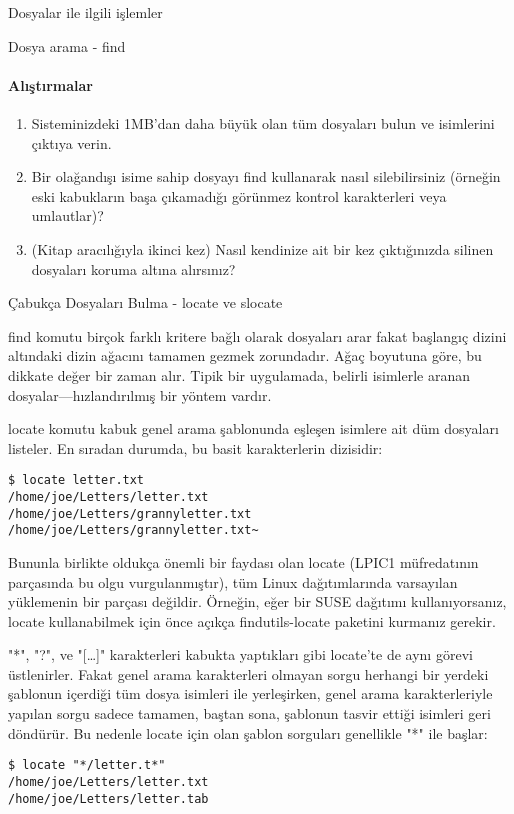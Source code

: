 \begin{section}{Dosyalar ile ilgili işlemler}
\begin{subsection}{Dosya arama - find}
\paragraph{{\Huge{\PencilLeftDown}}Alıştırmalar}{
\begin{enumerate}
 \item Sisteminizdeki 1MB'dan daha büyük olan tüm dosyaları bulun ve isimlerini çıktıya verin.
 \item Bir olağandışı isime sahip dosyayı find kullanarak nasıl silebilirsiniz (örneğin eski kabukların başa çıkamadığı görünmez kontrol karakterleri veya umlautlar)?
 \item (Kitap aracılığıyla ikinci kez) Nasıl kendinize ait bir kez çıktığınızda silinen dosyaları koruma altına alırsınız?
\end{enumerate}}
\end{subsection}
\begin{subsection}{Çabukça Dosyaları Bulma - locate ve slocate}

find komutu birçok farklı kritere bağlı olarak dosyaları arar fakat başlangıç dizini altındaki dizin ağacını tamamen gezmek zorundadır. Ağaç boyutuna göre, bu dikkate değer bir zaman alır. Tipik bir uygulamada, belirli isimlerle aranan dosyalar—hızlandırılmış bir yöntem vardır.

locate komutu kabuk genel arama şablonunda eşleşen isimlere ait düm dosyaları listeler. En sıradan durumda, bu basit karakterlerin dizisidir:
\begin{verbatim}
$ locate letter.txt
/home/joe/Letters/letter.txt
/home/joe/Letters/grannyletter.txt
/home/joe/Letters/grannyletter.txt~
\end{verbatim}

Bununla birlikte oldukça önemli bir faydası olan locate (LPIC1 müfredatının parçasında bu olgu vurgulanmıştır), tüm Linux dağıtımlarında varsayılan yüklemenin bir parçası değildir. Örneğin, eğer bir SUSE dağıtımı kullanıyorsanız, locate kullanabilmek için önce açıkça findutils-locate paketini kurmanız gerekir.

"*", "?", ve "[\ldots]" karakterleri kabukta yaptıkları gibi locate'te de aynı görevi üstlenirler. Fakat genel arama karakterleri olmayan sorgu herhangi bir yerdeki şablonun içerdiği tüm dosya isimleri ile yerleşirken, genel arama karakterleriyle yapılan sorgu sadece tamamen, baştan sona, şablonun tasvir ettiği isimleri geri döndürür. Bu nedenle locate için olan şablon sorguları genellikle "*" ile başlar:
\begin{verbatim}
$ locate "*/letter.t*"
/home/joe/Letters/letter.txt
/home/joe/Letters/letter.tab
\end{verbatim}


\end{subsection}
\end{section}
